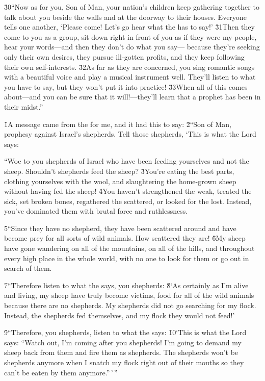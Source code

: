 \v{30}``Now as for you, Son of Man, your nation's children keep gathering together to talk about you beside the walls and at the doorway to their houses. Everyone tells one another, `Please come! Let's go hear what the  has to say!' \v{31}Then they come to you as a group, sit down right in front of you as if they were my people, hear your words---and then they don't do what you say--- because they're seeking only their own desires, they pursue ill-gotten profits, and they keep following their own self-interests. \v{32}As far as they are concerned, you sing romantic songs with a beautiful voice and play a musical instrument well. They'll listen to what you have to say, but they won't put it into practice! \v{33}When all of this comes about---and you can be sure that it will!---they'll learn that a prophet has been in their midst.''

\v{1}A message came from the  for me, and it had this to say: \v{2}``Son of Man, prophesy against Israel's shepherds. Tell those shepherds, `This is what the Lord  says:

``Woe to you shepherds of Israel who have been feeding yourselves and not the sheep. Shouldn't shepherds feed the sheep? \v{3}You're eating the best parts, clothing yourselves with the wool, and slaughtering the home-grown sheep without having fed the sheep! \v{4}You haven't strengthened the weak, treated the sick, set broken bones, regathered the scattered, or looked for the lost. Instead, you've dominated them with brutal force and ruthlessness.

\v{5}``Since they have no shepherd, they have been scattered around and have become prey for all sorts of wild animals. How scattered they are! \v{6}My sheep have gone wandering on all of the mountains, on all of the hills, and throughout every high place in the whole world, with no one to look for them or go out in search of them.

\v{7}``Therefore listen to what the  says, you shepherds: \v{8}`As certainly as I'm alive and living, my sheep have truly become victims, food for all of the wild animals because there are no shepherds. My shepherds did not go searching for my flock. Instead, the shepherds fed themselves, and my flock they would not feed!'

\v{9}``Therefore, you shepherds, listen to what the  says: \v{10}`This is what the Lord  says: ``Watch out, I'm coming after you shepherds! I'm going to demand my sheep back from them and fire them as shepherds. The shepherds won't be shepherds anymore when I snatch my flock right out of their mouths so they can't be eaten by them anymore.''\,'\,''

